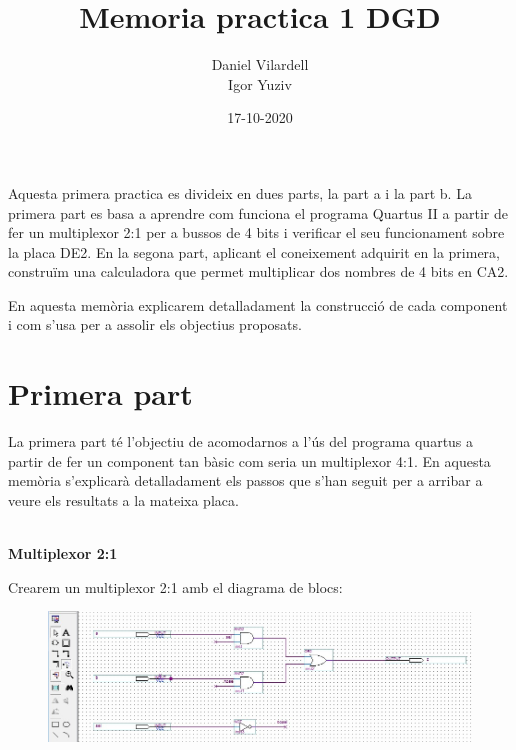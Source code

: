 \documentclass[12pt, a4papre]{article}
\author{Daniel Vilardell\\
	   Igor Yuziv}
\title{Memoria practica 1 DGD}
\date{17-10-2020}
\begin{document}
	\maketitle

Aquesta primera practica es divideix en dues parts, la part a i la part b. La primera part es basa a aprendre com funciona el programa Quartus II a partir de fer un multiplexor 2:1 per a bussos de 4 bits i verificar el seu funcionament sobre la placa DE2. En la segona part, aplicant el coneixement adquirit en la primera, construïm una calculadora que permet multiplicar dos nombres de 4 bits en CA2.

En aquesta memòria explicarem detalladament la construcció de cada component i com s'usa per a assolir els objectius proposats.

	\newpage
	\section{Primera part}
	
	La primera part té l'objectiu de acomodarnos a l'ús del programa quartus a partir de fer un component tan bàsic com seria un multiplexor 4:1. En aquesta memòria s'explicarà detalladament els passos que s'han seguit per a arribar a veure els resultats a la mateixa placa.\\\
	
	\textbf{\large{Multiplexor 2:1}}
	
	Crearem un multiplexor 2:1 amb el diagrama de blocs:
	\begin{figure}[H]
		\begin{center}
		\includegraphics[width=150mm]{multiplexor2_1.jpeg}
		\end{center}
	\end{figure}
	
\end{document}
